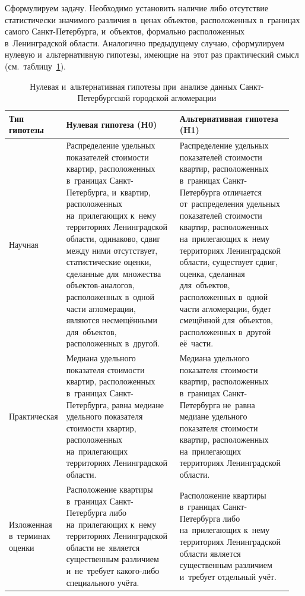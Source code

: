 \documentclass[]{scrreprt}
\begin{document}
Сформулируем задачу. Необходимо установить наличие либо отсутствие статистически значимого различия в~ценах объектов, расположенных в~границах самого Санкт-Петербурга, и~объектов, формально расположенных в~Ленинградской области. Аналогично предыдущему случаю, сформулируем нулевую и~альтернативную гипотезы, имеющие на~этот раз практический смысл (см.~таблицу~\ref{tab:nul-alt-hypothesis-SPba}).
\begin{table}[ht]
	\caption{Нулевая и~альтернативная гипотезы при~анализе данных Санкт-Петербургской городской агломерации}  \label{tab:nul-alt-hypothesis-SPba}
	\centering
	\begin{tabularx}{\textwidth}{p{0.15\linewidth} p{0.4\linewidth} p{0.4\linewidth}} 
		\hline
		Тип гипотезы&Нулевая гипотеза (H0)&Альтернативная гипотеза (H1)\\
		\hline
		Научная&Распределение удельных показателей стоимости квартир, расположенных в~границах Санкт-Петербурга, и~квартир, расположенных на~прилегающих к~нему территориях Ленинградской области, одинаково, сдвиг между ними отсутствует, статистические оценки, сделанные для~множества объектов-аналогов, расположенных в~одной части агломерации, являются несмещёнными для~объектов, расположенных в~другой.&Распределение удельных показателей стоимости квартир, расположенных в~границах Санкт-Петербурга отличается от~распределения удельных показателей стоимости квартир, расположенных на~прилегающих к~нему территориях Ленинградской области, существует сдвиг, оценка, сделанная для~объектов, расположенных в~одной части агломерации, будет смещённой для~объектов, расположенных в~другой её~части.\\
		\hline
		Практическая&Медиана удельного показателя стоимости квартир, расположенных в~границах Санкт-Петербурга, равна медиане удельного показателя стоимости квартир, расположенных на~прилегающих территориях Ленинградской области.&Медиана удельного показателя стоимости квартир, расположенных в~границах Санкт-Петербурга не~равна медиане удельного показателя стоимости квартир, расположенных на~прилегающих территориях Ленинградской области.\\
		\hline
		Изложенная в~терминах оценки&Расположение квартиры в~границах Санкт-Петербурга либо на~прилегающих к~нему территориях Ленинградской области не~является существенным различием и~не~требует какого-либо специального учёта.&Расположение квартиры в~границах Санкт-Петербурга либо на~прилегающих к~нему территориях Ленинградской области является существенным различием и~требует отдельный учёт.\\ \hline
	\end{tabularx}
\end{table}
\end{document}
